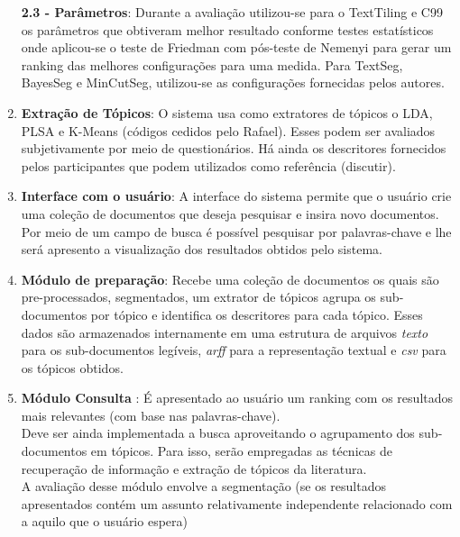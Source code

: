 \begin{enumerate}
	\textbf{2.3 - Parâmetros}: Durante a avaliação utilizou-se para o TextTiling e C99 os parâmetros que obtiveram melhor resultado conforme testes estatísticos onde aplicou-se o teste de Friedman com pós-teste de Nemenyi para gerar um ranking das melhores configurações para uma medida. 
	Para TextSeg, BayesSeg e MinCutSeg, utilizou-se as configurações fornecidas pelos autores.
	
\item \textbf{Extração de Tópicos}: O sistema usa como extratores de tópicos o LDA, PLSA e K-Means (códigos cedidos pelo Rafael). Esses podem ser avaliados subjetivamente por meio de questionários. Há ainda os descritores fornecidos pelos participantes que podem utilizados como referência (discutir).

\item \textbf{Interface com o usuário}: A interface do sistema permite que o usuário crie uma coleção de documentos que deseja pesquisar e insira novo documentos. Por meio de um campo de busca é possível pesquisar por palavras-chave e lhe será apresento a visualização dos resultados obtidos pelo sistema. 

\item \textbf{Módulo de preparação}: Recebe uma coleção de documentos os quais são pre-processados, segmentados, um extrator de tópicos agrupa os sub-documentos por tópico e identifica os descritores para cada tópico. Esses dados são armazenados internamente em uma estrutura de arquivos \textit{texto} para os sub-documentos legíveis, \textit{arff} para a representação textual e \textit{csv} para os tópicos obtidos.


\item \textbf{Módulo Consulta} : É apresentado ao usuário um ranking com os resultados mais relevantes (com base nas palavras-chave). \\Deve ser ainda implementada a busca aproveitando o agrupamento dos sub-documentos em tópicos. Para isso, serão empregadas as técnicas de recuperação de informação e extração de tópicos da literatura. \\A avaliação desse módulo envolve a segmentação (se os resultados apresentados contém um assunto relativamente independente relacionado com a aquilo que o usuário espera) 
	
\end{enumerate}








\vi 

